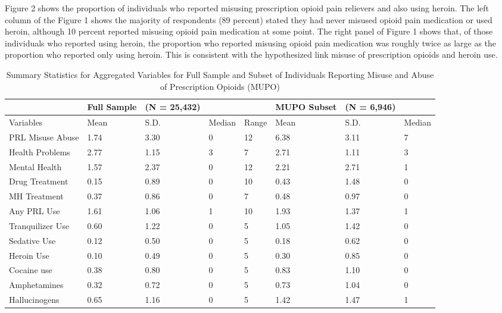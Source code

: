 \documentclass[sigconf]{acmart}
\begin{document}
Figure 2 shows the proportion of individuals who reported misusing prescription 
opioid pain relievers and also using heroin. The left column of the Figure 1 
shows the majority of respondents (89 percent) stated they had never misused 
opioid pain medication or used heroin, although 10 percent reported misusing 
opioid pain medication at some point. The right panel of Figure 1 shows that, 
of those individuals who reported using heroin, the proportion who reported 
misusing opioid pain medication was roughly twice as large as the proportion 
who reported only using heroin. This is consistent with the hypothesized 
link misuse of prescription opioids and heroin use. 

\begin{table*}[ht]
  \caption{Summary Statistics for Aggregated Variables for Full Sample and 
  Subset of Individuals Reporting Misuse and Abuse of Prescription Opioids (MUPO)}
  \label{tab:freq}
  \begin{tabular}{llllllll}
    \toprule
     & Full Sample& (N = 25,432)&&& MUPO Subset& (N = 6,946)&  \\
    \midrule
    Variables & Mean& S.D.& Median& Range& Mean& S.D.& Median  \\
    \midrule
    PRL Misuse Abuse& 1.74& 3.30& 0& 12& 6.38& 3.11 & 7 \\
    Health Problems& 2.77& 1.15& 3& 7& 2.71& 1.11& 3  \\
    Mental Health& 1.57& 2.37& 0& 12& 2.21& 2.71& 1  \\
    Drug Treatment& 0.15& 0.89& 0& 10& 0.43& 1.48& 0  \\
    MH Treatment& 0.37& 0.86& 0& 7& 0.48& 0.97& 0  \\
    Any PRL Use& 1.61& 1.06& 1& 10& 1.93& 1.37& 1 \\
    Tranquilizer Use& 0.60& 1.22& 0& 5& 1.05& 1.42& 0  \\
    Sedative Use& 0.12& 0.50& 0& 5& 0.18& 0.62& 0  \\
    Heroin Use& 0.10& 0.49& 0& 5& 0.30& 0.85& 0  \\
    Cocaine use& 0.38& 0.80& 0& 5& 0.83& 1.10& 0 \\
    Amphetamines& 0.32& 0.72& 0& 5& 0.73& 1.04& 0  \\
    Hallucinogens& 0.65& 1.16& 0& 5& 1.42& 1.47& 1  \\
    \bottomrule
  \end{tabular}
\end{table*}

\end{document}
